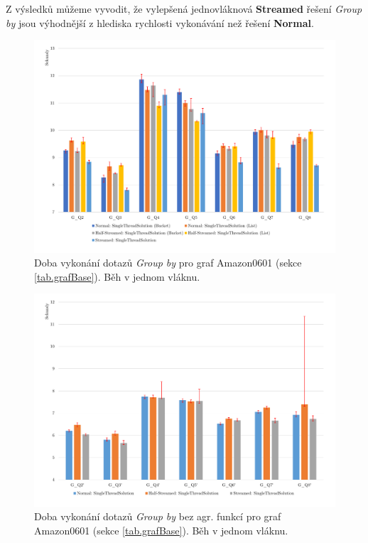 \bigskip
Z výsledků můžeme vyvodit, že vylepšená jednovláknová \textbf{Streamed} řešení \textit{Group by} jsou výhodnější z hlediska rychlosti vykonávání než řešení \textbf{Normal}. 

\begin{figure}[!htp]
\includegraphics[width=\linewidth]{../img/amazonGroupByST.pdf}\centering
\caption{Doba vykonání dotazů \textit{Group by} pro graf Amazon0601 (sekce \ref{tab.grafBase}). Běh v jednom vláknu.}
\label{figure.amazonGroupByST}
\end{figure}
\begin{figure}[!htp]
\includegraphics[width=\linewidth]{../img/amazonGroupBySTNoAgg.pdf}\centering
\caption{Doba vykonání dotazů \textit{Group by} bez agr. funkcí pro graf Amazon0601 (sekce \ref{tab.grafBase}). Běh v jednom vláknu.}
\label{figure.amazonGroupBySTNoAgg}
\end{figure}

